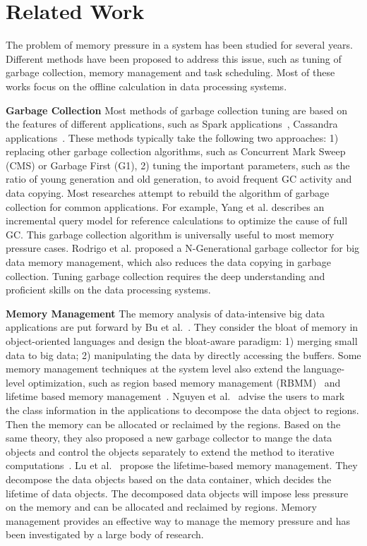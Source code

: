 \section{Related Work}

The problem of memory pressure in a system has been studied for several years. Different methods have been proposed to address this issue, such as tuning of garbage collection, memory management and task scheduling. Most of these works focus on the offline calculation in data processing systems. 

\textbf{Garbage Collection} Most methods of garbage collection tuning are based on the features of different applications, such as Spark applications~\cite{www:spark-tuning}, Cassandra applications~\cite{www:cassandra}. These methods typically take the following two approaches: 1) replacing other garbage collection algorithms, such as Concurrent Mark Sweep (CMS) or Garbage First (G1), 2) tuning the important parameters, such as the ratio of young generation and old generation, to avoid frequent GC activity and data copying. Most researches attempt to rebuild the algorithm of garbage collection for common applications. For example, Yang et al.\cite{yang:fullgc} describes an incremental query model for reference calculations to optimize the cause of full GC. This garbage collection algorithm is universally useful to most memory pressure cases. Rodrigo et al.\cite{rodigo:NGeneration} proposed a N-Generational garbage collector for big data memory management, which also reduces the data copying in garbage collection. Tuning garbage collection requires the deep understanding and proficient skills on the data processing systems.

\textbf{Memory Management} The memory analysis of data-intensive big data applications are put forward by Bu et al.~\cite{bu:bloat}. They consider the bloat of memory in object-oriented languages and design the bloat-aware paradigm: 1) merging small data to big data; 2) manipulating the data by directly accessing the buffers. Some memory management techniques at the system level also extend the language-level optimization, such as region based memory management (RBMM)~\cite{nguyen2015facade, nguyen:yak} and lifetime based memory management~\cite{lulu:deca}. Nguyen et al.~\cite{nguyen2015facade} advise the users to mark the class information in the applications to decompose the data object to regions. Then the memory can be allocated or reclaimed by the regions. Based on the same theory, they also proposed a new garbage collector to mange the data objects and control the objects separately to extend the method to iterative computations~\cite{nguyen:yak}. Lu et al.~\cite{lulu:deca} propose the lifetime-based memory management. They decompose the data objects based on the data container, which decides the lifetime of data objects. The decomposed data objects will impose less pressure on the memory and can be allocated and reclaimed by regions. Memory management provides an effective way to manage the memory pressure and has been investigated by a large body of research.

